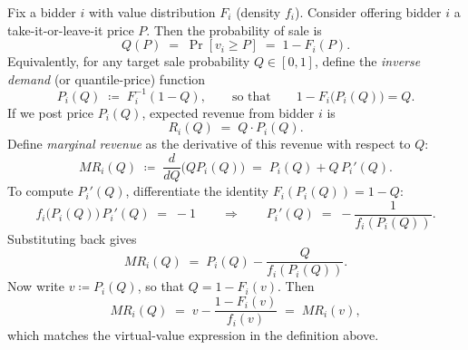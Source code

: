 	\begin{remark}
	Fix a bidder $i$ with value distribution $F_i$ (density $f_i$).  Consider offering bidder $i$
	a take-it-or-leave-it price $P$.  Then the probability of sale is
	\[
	Q(P)\;=\;\Pr[v_i\ge P]\;=\;1-F_i(P).
	\]
	Equivalently, for any target sale probability $Q\in[0,1]$, define the \emph{inverse demand}
	(or quantile-price) function
	\[
	P_i(Q)\;\coloneqq\;F_i^{-1}(1-Q),
	\qquad\text{so that}\qquad
	1-F_i\!\big(P_i(Q)\big)=Q.
	\]
	If we post price $P_i(Q)$, expected revenue from bidder $i$ is
	\[
	R_i(Q)\;=\;Q\cdot P_i(Q).
	\]
	Define \emph{marginal revenue} as the derivative of this revenue with respect to $Q$:
	\[
	MR_i(Q)\;\coloneqq\;\frac{d}{dQ}\big(QP_i(Q)\big)\;=\;P_i(Q)+Q\,P_i'(Q).
	\]
	To compute $P_i'(Q)$, differentiate the identity $F_i(P_i(Q))=1-Q$:
	\[
	f_i\!\big(P_i(Q)\big)\,P_i'(Q)\;=\;-1
	\qquad\Rightarrow\qquad
	P_i'(Q)\;=\;-\frac{1}{f_i(P_i(Q))}.
	\]
	Substituting back gives
	\[
	MR_i(Q)
	\;=\;
	P_i(Q)-\frac{Q}{f_i(P_i(Q))}.
	\]
	Now write $v\coloneqq P_i(Q)$, so that $Q=1-F_i(v)$.  Then
	\[
	MR_i(Q)
	\;=\;
	v-\frac{1-F_i(v)}{f_i(v)}
	\;=\;MR_i(v),
	\]
	which matches the virtual-value expression in the definition above.
\end{remark}

